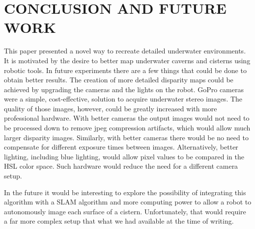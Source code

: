 \documentclass[a4paper,twoside]{article}
\begin{document}

\section{\uppercase{Conclusion and Future Work}}
\label{sec:conclusion}

\noindent 
This paper presented a novel way to recreate detailed underwater environments.
It is motivated by the desire to better map underwater caverns and cisterns using robotic tools.  
In future experiments there are a few things that could be done to obtain better results.
The creation of more detailed disparity maps could be achieved by upgrading the cameras and the lights on the robot.  
GoPro cameras were a simple, cost-effective, solution to acquire underwater stereo images.  
The quality of those images, however, could be greatly increased with more professional hardware.  
With better cameras the output images would not need to be processed down to remove jpeg compression artifacts, which would allow much larger disparity images.  
Similarly, with better cameras there would be no need to compensate for different exposure times between images.
Alternatively, better lighting, including blue lighting, would allow pixel values to be compared in the HSL color space.  
Such hardware would reduce the need for a different camera setup.

In the future it would be interesting to explore the possibility of integrating this algorithm with a SLAM algorithm and more computing power to allow a robot to autonomously image each surface of a cistern. 
Unfortunately, that would require a far more complex setup that what we had available at the time of writing.




\end{document}
